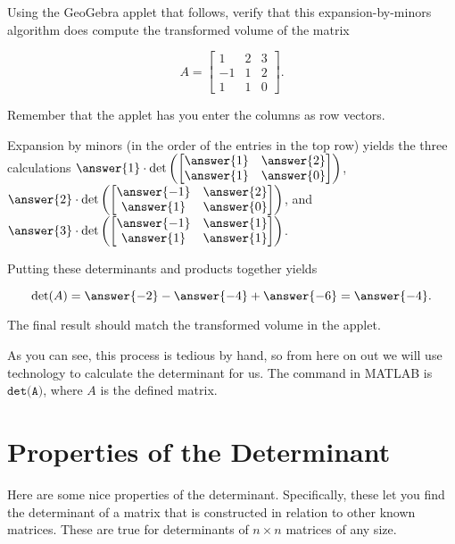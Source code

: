 \documentclass{ximera}
\begin{document}
\begin{example}
    Using the GeoGebra applet that follows, verify that this expansion-by-minors algorithm does compute the transformed volume of the matrix 
    
    $$A=\begin{bmatrix}
        1&2&3\\-1&1&2\\1&1&0
    \end{bmatrix}.$$

    \begin{center}
    \end{center}

    Remember that the applet has you enter the columns as row vectors. 

    Expansion by minors (in the order of the entries in the top row) yields the three calculations $\answer{1}\cdot\mbox{det}\left(\begin{bmatrix}
        \answer{1} & \answer{2}\\\answer{1}&\answer{0}
    \end{bmatrix}\right)$, $\answer{2}\cdot\mbox{det}\left(\begin{bmatrix}
        \answer{-1} & \answer{2}\\\answer{1}&\answer{0}
    \end{bmatrix}\right)$, and $\answer{3}\cdot\mbox{det}\left(\begin{bmatrix}
        \answer{-1} & \answer{1}\\\answer{1}&\answer{1}
    \end{bmatrix}\right)$.

    Putting these determinants and products together yields

    $$\mbox{det}(A)=\answer{-2}-\answer{-4}+\answer{-6}=\answer{-4}.$$

    The final result should match the transformed volume in the applet.
\end{example}

As you can see, this process is tedious by hand, so from here on out we will use technology to calculate the determinant for us. The command in MATLAB is $\texttt{det(A)}$, where $A$ is the defined matrix. 

\section*{Properties of the Determinant}

Here are some nice properties of the determinant. Specifically, these let you find the determinant of a matrix that is constructed in relation to other known matrices. These are true for determinants of $n\times n$ matrices of any size. 
\end{document}
